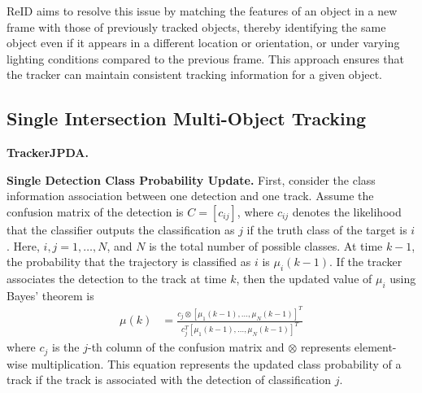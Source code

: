 \documentclass[lettersize,journal]{IEEEtran}
\begin{document}
ReID aims to resolve this issue by matching the features of an object in a new frame with those of previously tracked objects, thereby identifying the same object even if it appears in a different location or orientation, or under varying lighting conditions compared to the previous frame. 
This approach ensures that the tracker can maintain consistent tracking information for a given object\cite{Alpher24d}.


\subsection{Single Intersection Multi-Object Tracking}

\textbf{TrackerJPDA.}

\textbf{Single Detection Class Probability Update.}
First, consider the class information association between one detection and one track. 
Assume the confusion matrix of the detection is \(C=\left[c_{i j}\right]\), where \(c_{i j}\) denotes the likelihood that the classifier outputs the classification as \(j\) if the truth class of the target is \(i\).
Here, \(i,j = 1,…, N\), and \(N\) is the total number of possible classes.
At time \(k-1\), the probability that the trajectory is classified as \(i\) is \(\mu_{i}(k-1)\).
If the tracker associates the detection to the track at time \(k\), then the updated value of \(\mu_{i}\) using Bayes' theorem is
\begin{align}
	\mu(k) & = \frac{c_{j} \otimes [ \mu_1(k-1), \ldots, \mu_N(k-1) ]^T}{c_{j}^{T} [ \mu_1(k-1), \ldots, \mu_N(k-1) ]^T}
\end{align}
where \(c_{j}\) is the \(j\)-th column of the confusion matrix and \(\otimes\) represents element-wise multiplication. 
This equation represents the updated class probability of a track if the track is associated with the detection of classification \(j\).
\end{document}
